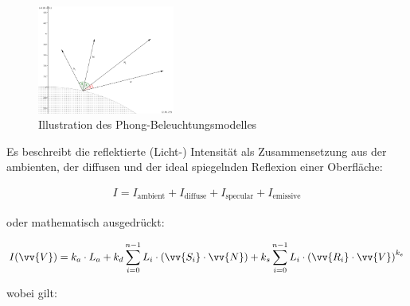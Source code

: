 \begin{figure}[H]
    \centering
    \includegraphics[width=0.4\textwidth]{img/phong_illustration.png}
    \caption{Illustration des Phong-Beleuchtungsmodelles\protect\footnotemark}\label{fig:phong_illustration}
\end{figure}


Es beschreibt die reflektierte (Licht-) Intensität als Zusammensetzung aus der ambienten, der diffusen und der ideal spiegelnden Reflexion einer Oberfläche:

\begin{gather}
    I = I_{\text{ambient}} + I_{\text{diffuse}} + I_{\text{specular}} + I_{\text{emissive}}
\end{gather}

oder mathematisch ausgedrückt:

\begin{gather}
    I(\vv{V}) = k_{a} \cdot L_{a} +
                k_{d} \displaystyle\sum_{i=0}^{n - 1} L_{i} \cdot (\vv{S_{i}} \cdot \vv{N}) +
                k_{s} \displaystyle\sum_{i=0}^{n - 1} L_{i} \cdot {(\vv{R_{i}} \cdot \vv{V})}^{k_{e}}
\end{gather}

wobei gilt:

